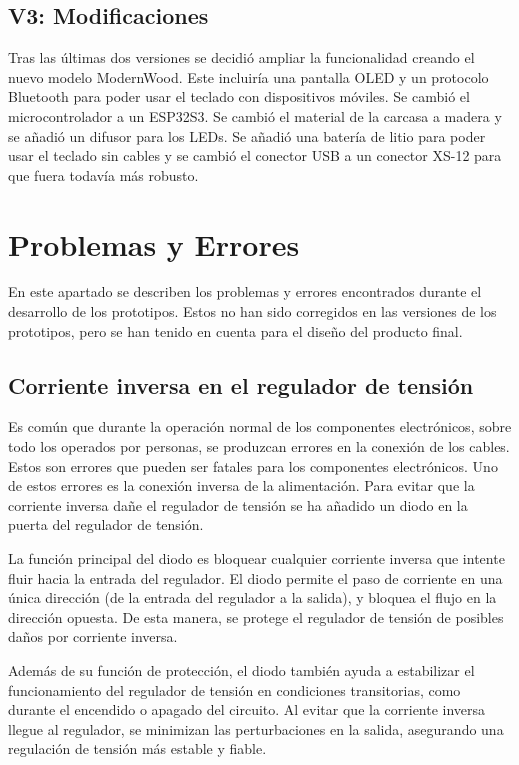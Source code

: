 \subsection{V3: Modificaciones}
Tras las últimas dos versiones se decidió ampliar la funcionalidad creando el nuevo modelo ModernWood. Este incluiría una pantalla \gls{OLED} y un protocolo \gls{Bluetooth} para poder usar el teclado con dispositivos móviles. Se cambió el microcontrolador a un ESP32S3. Se cambió el material de la carcasa a madera y se añadió un difusor para los \gls{LED}s. Se añadió una batería de litio para poder usar el teclado sin cables y se cambió el conector \gls{USB} a un conector XS-12 para que fuera todavía más robusto.

\section{Problemas y Errores} \label{Errores}
En este apartado se describen los problemas y errores encontrados durante el desarrollo de los prototipos. Estos no han sido corregidos en las versiones de los prototipos, pero se han tenido en cuenta para el diseño del producto final.
\subsection{Corriente inversa en el regulador de tensión} \label{CorrienteInversa}
Es común que durante la operación normal de los componentes electrónicos, sobre todo los operados por personas, se produzcan errores en la conexión de los cables. Estos son errores que pueden ser fatales para los componentes electrónicos. Uno de estos errores es la conexión inversa de la alimentación. Para evitar que la corriente inversa dañe el regulador de tensión se ha añadido un diodo en la puerta del regulador de tensión.

La función principal del diodo es bloquear cualquier corriente inversa que intente fluir hacia la entrada del regulador. El diodo permite el paso de corriente en una única dirección (de la entrada del regulador a la salida), y bloquea el flujo en la dirección opuesta. De esta manera, se protege el regulador de tensión de posibles daños por corriente inversa.

Además de su función de protección, el diodo también ayuda a estabilizar el funcionamiento del regulador de tensión en condiciones transitorias, como durante el encendido o apagado del circuito. Al evitar que la corriente inversa llegue al regulador, se minimizan las perturbaciones en la salida, asegurando una regulación de tensión más estable y fiable.

